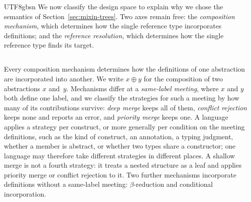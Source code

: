 \begin{CJK*}{UTF8}{gbsn}
We now classify the design space to explain why we chose the
semantics of Section~\ref{sec:mixin-trees}.
Two axes remain free:
the \emph{composition mechanism}, which determines how the single reference
type incorporates definitions;
and the \emph{reference resolution}, which determines how the single reference
type finds its target.

\subsection*{}

Every composition mechanism determines how the definitions of one
abstraction are incorporated into another.
We write $x \oplus y$ for the composition of two abstractions $x$
and~$y$.
Mechanisms differ at a \emph{same-label meeting}, where $x$ and $y$
both define one label, and we classify the strategies for such a
meeting by how many of its contributions survive:
\emph{deep merge} keeps all of them,
\emph{conflict rejection} keeps none and reports an error,
and \emph{priority merge} keeps one.
A language applies a strategy per construct, or more generally per
condition on the meeting definitions, such as the kind of construct,
an annotation, a typing judgment, whether a member is abstract, or
whether two types share a constructor; one language may therefore
take different strategies in different places.
A shallow merge is not a fourth strategy: it treats a nested
structure as a leaf and applies priority merge or conflict rejection
to it.
Two further mechanisms incorporate definitions without a same-label
meeting: $\beta$-reduction and conditional incorporation.


\end{CJK*}
